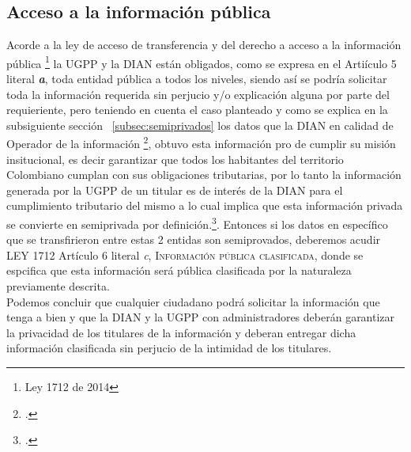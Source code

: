\documentclass[
letterpaper,
12pt,
singlespacing,
headsepline]{article}
\begin{document}
\subsection{Acceso a la información pública}
Acorde a la ley de acceso de transferencia y del derecho a acceso a la información pública \footnote{Ley 1712 de 2014} la UGPP y la DIAN están obligados, como se expresa en el Artiículo 5 literal \textbf{\textit{a}}, toda entidad pública a todos los niveles, siendo así se podría solicitar toda la información requerida sin perjucio y/o explicación alguna por parte del requieriente, pero teniendo en cuenta el caso planteado y como se explica en la subsiguiente sección ~\ref{subsec:semiprivados} los datos que la DIAN en calidad de Operador de la información \footcite{Ley 1266 de 2008 Articulo 3, Definiciones}, obtuvo esta información pro de cumplir su misión insitucional, es decir garantizar que todos los habitantes del territorio Colombiano cumplan con sus obligaciones tributarias, por lo tanto la información generada por la UGPP de un titular es de interés de la DIAN para el cumplimiento tributario del mismo a lo cual implica que esta información privada se convierte en semiprivada por definición.\footcite{Ley 1266 de 2008 Articulo 5, Definiciones - Dato Semiprivado}.
Entonces si los datos en específico que se transfirieron entre estas 2 entidas son semiprovados, deberemos acudir LEY 1712 Artículo 6 literal \textit{c}, \textsc{Información pública clasificada}, donde se espcifica que esta información será pública clasificada por la naturaleza previamente descrita.
\\
Podemos concluir que cualquier ciudadano podrá solicitar la información que tenga a bien y que la DIAN y la UGPP con administradores deberán garantizar la privacidad de los titulares de la información y deberan entregar dicha información clasificada sin perjucio de la intimidad de los titulares.
\end{document}
